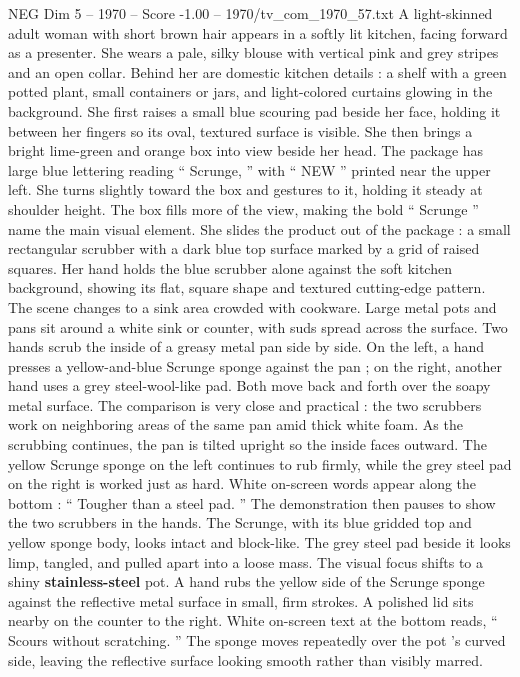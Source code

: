 \begin{textsample}{NEG Dim 5 – 1970 – Score -1.00 – 1970/tv\_com\_1970\_57.txt}  \label{ex:f5_neg_015}
A light-skinned adult woman with short brown hair appears in a softly lit kitchen, facing forward as a presenter.
She wears a pale, silky blouse with vertical pink and grey stripes and an open collar.
Behind her are domestic kitchen details : a shelf with a green potted plant, small containers or jars, and light-colored curtains glowing in the background.
She first raises a small blue scouring pad beside her face, holding it between her fingers so its oval, textured surface is visible.
She then brings a bright lime-green and orange box into view beside her head.
The package has large blue lettering reading “ Scrunge, ” with “ NEW ” printed near the upper left.
She turns slightly toward the box and gestures to it, holding it steady at shoulder height.
The box fills more of the view, making the bold “ Scrunge ” name the main visual element.
She slides the product out of the package : a small rectangular scrubber with a dark blue top surface marked by a grid of raised squares.
Her hand holds the blue scrubber alone against the soft kitchen background, showing its flat, square shape and textured cutting-edge pattern.
The scene changes to a sink area crowded with cookware.
Large metal pots and pans sit around a white sink or counter, with suds spread across the surface.
Two hands scrub the inside of a greasy metal pan side by side.
On the left, a hand presses a yellow-and-blue Scrunge sponge against the pan ; on the right, another hand uses a grey steel-wool-like pad.
Both move back and forth over the soapy metal surface.
The comparison is very close and practical : the two scrubbers work on neighboring areas of the same pan amid thick white foam.
As the scrubbing continues, the pan is tilted upright so the inside faces outward.
The yellow Scrunge sponge on the left continues to rub firmly, while the grey steel pad on the right is worked just as hard.
White on-screen words appear along the bottom : “ Tougher than a steel pad. ” The demonstration then pauses to show the two scrubbers in the hands.
The Scrunge, with its blue gridded top and yellow sponge body, looks intact and block-like.
The grey steel pad beside it looks limp, tangled, and pulled apart into a loose mass.
The visual focus shifts to a shiny \textbf{stainless-steel} pot.
A hand rubs the yellow side of the Scrunge sponge against the reflective metal surface in small, firm strokes.
A polished lid sits nearby on the counter to the right.
White on-screen text at the bottom reads, “ Scours without scratching. ” The sponge moves repeatedly over the pot ’s curved side, leaving the reflective surface looking smooth rather than visibly marred.

\end{textsample}
